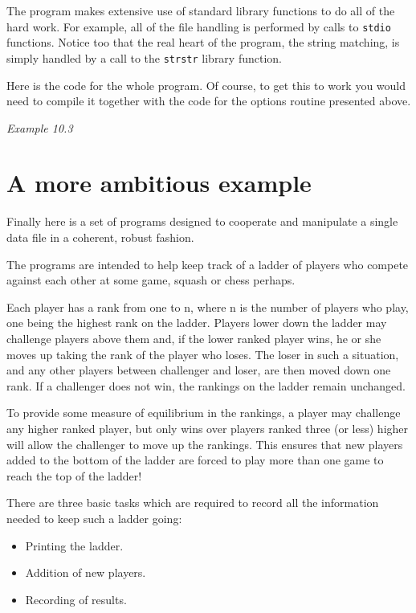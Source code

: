   The program makes extensive use of standard library functions to do all of
   the hard work. For example, all of the file handling is performed by calls
   to \texttt{stdio} functions. Notice too that the real heart of the
   program, the string matching, is simply handled by a call to the
   \texttt{strstr} library function.


  Here is the code for the whole program. Of course, to get this to work you
   would need to compile it together with the code for the options routine
   presented above.


  \begin{center}\textit{Example 10.3}\end{center}


 
        \section{A more ambitious example}
        

  

  Finally here is a set of programs designed to cooperate and manipulate
   a single data file in a coherent, robust fashion.


  The programs are intended to help keep track of a ladder of players who
   compete against each other at some game, squash or chess perhaps.


  Each player has a rank from one to n, where n is the number of players who
   play, one being the highest rank on the ladder. Players lower down the
   ladder may challenge players above them and, if the lower ranked player
   wins, he or she moves up taking the rank of the player who loses. The loser
   in such a situation, and any other players between challenger and loser, are
   then moved down one rank. If a challenger does not win, the rankings on the
   ladder remain unchanged.


  To provide some measure of equilibrium in the rankings, a player may
   challenge any higher ranked player, but only wins over players ranked three
   (or less) higher will allow the challenger to move up the rankings. This
   ensures that new players added to the bottom of the ladder are forced to
   play more than one game to reach the top of the ladder!


  There are three basic tasks which are required to record all the
   information needed to keep such a ladder going:


  \begin{itemize}
   \item Printing the ladder.
   \item Addition of new players.
   \item Recording of results.
  \end{itemize}

